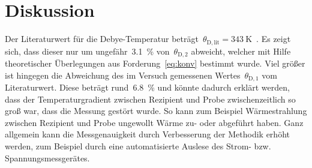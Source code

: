 \section{Diskussion}
\label{sec:diskussion}
Der Literaturwert für die Debye-Temperatur
beträgt~$\theta_{\mathrm{D,lit}}=\SI{343}{\kelvin}$~\cite{kittel}.
Es zeigt sich, dass dieser nur um ungefähr~\SI{3.1}{\percent}
von~$\theta_{\mathrm{D,2}}$ abweicht, welcher mit Hilfe theoretischer
Überlegungen aus Forderung~\eqref{eq:konv} bestimmt wurde.
Viel größer ist hingegen die Abweichung des im Versuch gemessenen
Wertes~$\theta_{\mathrm{D,1}}$ vom Literaturwert. Diese beträgt
rund~\SI{6.8}{\percent} und könnte dadurch erklärt werden, dass der
Temperaturgradient zwischen Rezipient und Probe zwischenzeitlich so groß war,
dass die Messung gestört wurde. So kann zum Beispiel Wärmestrahlung zwischen
Rezipient und Probe ungewollt Wärme zu- oder abgeführt haben. Ganz allgemein
kann die Messgenauigkeit durch Verbesserung der Methodik erhöht werden, zum
Beispiel durch eine automatisierte Auslese des Strom- bzw. Spannungsmessgerätes.
